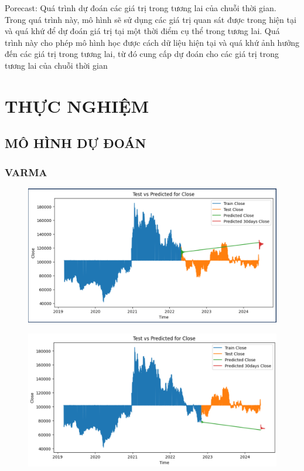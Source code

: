 \documentclass{article}
\begin{document}
\begin{multicols}{2}
            Porecast: Quá trình dự đoán các giá trị trong tương lai của chuỗi thời gian. Trong quá trình này, mô hình sẽ sử dụng các giá trị quan sát được trong hiện tại và quá khứ để dự đoán giá trị tại một thời điểm cụ thể trong tương lai. Quá trình này cho phép mô hình học được cách dữ liệu hiện tại và quá khứ ảnh hưởng đến các giá trị trong tương lai, từ đó cung cấp dự đoán cho các giá trị trong tương lai của chuỗi thời gian

\section{THỰC NGHIỆM}

\subsection{MÔ HÌNH DỰ ĐOÁN }

\subsubsection{VARMA}
\begin{figure}[H]
    \centering
    \begin{minipage}{0.15\textwidth}
    \centering
    \includegraphics[width=1\textwidth]{Image/VARMA/LG/6_4/30.png}
   
    \label{fig:1}
    \end{minipage}%
    \begin{minipage}{0.15\textwidth}
    \centering
    \includegraphics[width=1\textwidth]{Image/VARMA/LG/7_3/30.png}
  

\end{minipage}
\end{figure}
\end{multicols}
\end{document}
